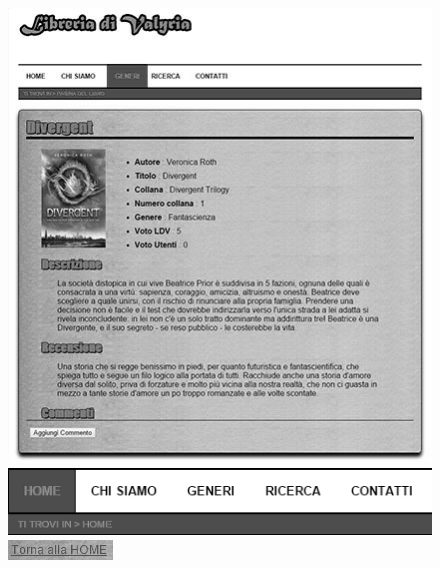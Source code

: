 \begin{figure}[H]
\begin{minipage}{0.45\textwidth}
\includegraphics[width=\linewidth]{images/bn_originale.png}
\end{minipage}
\hspace{\fill}
\begin{minipage}{0.45\textwidth}
\includegraphics[width=\linewidth]{images/bn_headerbreadcrumb.jpg}
\end{minipage}
\vspace*{0.5cm}
\begin{minipage}{0.45\textwidth}
\includegraphics[width=\linewidth]{images/bn_tornahome.jpg}

\end{minipage}
\end{figure}
